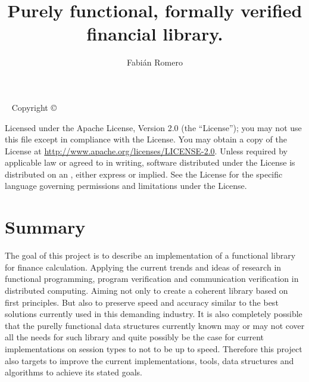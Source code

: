 \documentclass{tufte-book} %
\title{Purely functional, formally verified financial library.} %
\author{Fabián Romero} %
\begin{document}
\maketitle %

\newpage
\begin{fullwidth}
~\vfill
\thispagestyle{empty}
\setlength{\parindent}{0pt}
\setlength{\parskip}{\baselineskip}
Copyright \copyright\ \the\year\ \thanklessauthor

\par{}

\par{}

\par Licensed under the Apache License, Version 2.0 (the ``License''); you may not use this file except in compliance with the License. You may obtain a copy of the License at \url{http://www.apache.org/licenses/LICENSE-2.0}. Unless required by applicable law or agreed to in writing, software distributed under the License is distributed on an , either express or implied. See the License for the specific language governing permissions and limitations under the License.

\end{fullwidth}

\tableofcontents %

\chapter{Summary} 

The goal of this project is to describe an implementation of a functional library for finance calculation. Applying the current trends and ideas of research in functional programming, program verification and communication verification in distributed computing. Aiming not only to create a coherent library based on first principles. But also to preserve speed and accuracy similar to the best solutions currently used in this demanding industry. It is also completely possible that the purelly functional data structures currently known may or may not cover all the needs for such library and quite possibly be the case for current implementations on session types to not to be up to speed. Therefore this project also targets to improve the current implementations, tools, data structures and algorithms to achieve its stated goals.
\end{document}
